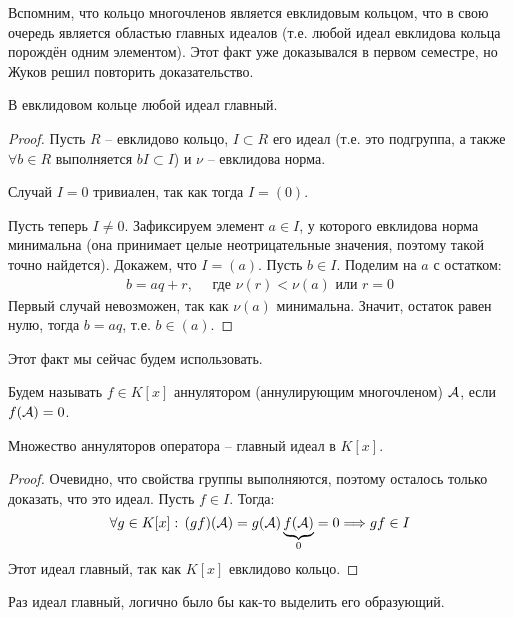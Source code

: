 Вспомним, что кольцо многочленов является евклидовым кольцом, что в свою очередь является областью главных идеалов (т.е. любой идеал евклидова кольца порождён одним элементом). 
Этот факт уже доказывался в первом семестре, но Жуков решил повторить доказательство. 

\begin{lemma}
    В евклидовом кольце любой идеал главный.

    \begin{proof}
    Пусть $R$ -- евклидово кольцо, $I \subset R$ его идеал (т.е. это подгруппа, а также $\forall b \in R$ выполняется $bI \subset I$) и $\nu$ -- евклидова норма.
    
    \quad Случай $I = 0$ тривиален, так как тогда $I = (0)$.

    \quad Пусть теперь $I \neq 0$. 
    Зафиксируем элемент $a \in I$, у которого евклидова норма минимальна (она принимает целые неотрицательные значения, поэтому такой точно найдется).
    Докажем, что $I = (a)$. Пусть $ b \in I$. Поделим на $a$ с остатком:
    \begin{gather*}
        b = aq + r, \quad \text{ где } \nu(r) < \nu(a) \text{ или } r = 0
    \end{gather*}
    \quad Первый случай невозможен, так как $ \nu(a) $ минимальна. 
    Значит, остаток равен нулю, тогда $b = aq$, т.е. $b \in (a)$.
    \end{proof}
\end{lemma}

\vspace*{3mm}

Этот факт мы сейчас будем использовать.

\begin{conj} 
    Будем называть $f \in K[x]$ аннулятором (аннулирующим многочленом) $\mathcal{A}$, если $f(\mathcal{A}) = 0$.
\end{conj}

\begin{theorem}
    Множество аннуляторов оператора -- главный идеал в $K[x]$.
\end{theorem}
\begin{proof}
    Очевидно, что свойства группы выполняются, поэтому осталось только доказать, что это идеал.
    Пусть $ f \in I$. Тогда:
    \[ \forall g \in K[x]: \, (gf)(\mathcal{A}) = g(\mathcal{A}) \underbrace{f(\mathcal{A})}_{0} = 0 \Longrightarrow gf \in I \]
    \quad Этот идеал главный, так как $K[x]$ евклидово кольцо.
\end{proof}

Раз идеал главный, логично было бы как-то выделить его образующий.

